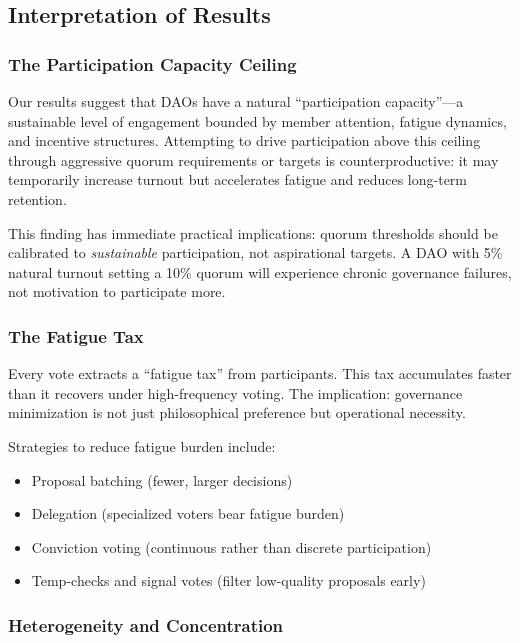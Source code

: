 
\subsection{Interpretation of Results}

\subsubsection{The Participation Capacity Ceiling}

Our results suggest that DAOs have a natural ``participation capacity''---a sustainable level of engagement bounded by member attention, fatigue dynamics, and incentive structures. Attempting to drive participation above this ceiling through aggressive quorum requirements or targets is counterproductive: it may temporarily increase turnout but accelerates fatigue and reduces long-term retention.

This finding has immediate practical implications: quorum thresholds should be calibrated to \textit{sustainable} participation, not aspirational targets. A DAO with 5\% natural turnout setting a 10\% quorum will experience chronic governance failures, not motivation to participate more.

\subsubsection{The Fatigue Tax}

Every vote extracts a ``fatigue tax'' from participants. This tax accumulates faster than it recovers under high-frequency voting. The implication: governance minimization is not just philosophical preference but operational necessity.

Strategies to reduce fatigue burden include:
\begin{itemize}
    \item Proposal batching (fewer, larger decisions)
    \item Delegation (specialized voters bear fatigue burden)
    \item Conviction voting (continuous rather than discrete participation)
    \item Temp-checks and signal votes (filter low-quality proposals early)
\end{itemize}

\subsubsection{Heterogeneity and Concentration}

